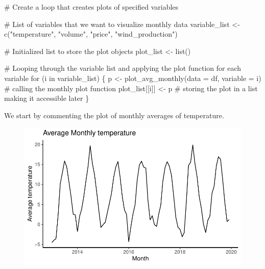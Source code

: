 \documentclass[
  letterpaper,
  DIV=11,
  numbers=noendperiod]{scrartcl}
\newenvironment{Shaded}{\begin{snugshade}}{\end{snugshade}}
\newcommand{\AttributeTok}[1]{\textcolor[rgb]{0.40,0.45,0.13}{#1}}
\newcommand{\CommentTok}[1]{\textcolor[rgb]{0.37,0.37,0.37}{#1}}
\newcommand{\ControlFlowTok}[1]{\textcolor[rgb]{0.00,0.23,0.31}{#1}}
\newcommand{\FunctionTok}[1]{\textcolor[rgb]{0.28,0.35,0.67}{#1}}
\newcommand{\NormalTok}[1]{\textcolor[rgb]{0.00,0.23,0.31}{#1}}
\newcommand{\OtherTok}[1]{\textcolor[rgb]{0.00,0.23,0.31}{#1}}
\newcommand{\SpecialCharTok}[1]{\textcolor[rgb]{0.37,0.37,0.37}{#1}}
\newcommand{\StringTok}[1]{\textcolor[rgb]{0.13,0.47,0.30}{#1}}
\begin{document}
\begin{Shaded}
\begin{Highlighting}[]
\CommentTok{\# Create a loop that creates plots of specified variables}

\CommentTok{\# List of variables that we want to visualize monthly data}
\NormalTok{variable\_list }\OtherTok{\textless{}{-}} \FunctionTok{c}\NormalTok{(}\StringTok{"temperature"}\NormalTok{, }\StringTok{"volume"}\NormalTok{, }\StringTok{"price"}\NormalTok{, }\StringTok{"wind\_production"}\NormalTok{)}

\CommentTok{\# Initialized list to store the plot objects}
\NormalTok{plot\_list }\OtherTok{\textless{}{-}} \FunctionTok{list}\NormalTok{()}

\CommentTok{\# Looping through the variable list and applying the plot function for each variable}
\ControlFlowTok{for}\NormalTok{ (i }\ControlFlowTok{in}\NormalTok{ variable\_list) \{}
\NormalTok{  p }\OtherTok{\textless{}{-}} \FunctionTok{plot\_avg\_monthly}\NormalTok{(}\AttributeTok{data =}\NormalTok{ df, }\AttributeTok{variable =}\NormalTok{ i)  }\CommentTok{\# calling the monthly plot function}
\NormalTok{  plot\_list[[i]] }\OtherTok{\textless{}{-}}\NormalTok{ p                             }\CommentTok{\# storing the plot in a list making it accessible later                 }
\NormalTok{\}}
\end{Highlighting}
\end{Shaded}

We start by commenting the plot of monthly averages of temperature.

\begin{Shaded}
\end{Shaded}

\begin{figure}[H]

{\centering \includegraphics{Assignment2_files/figure-pdf/unnamed-chunk-5-1.pdf}

}

\end{figure}
\end{document}
